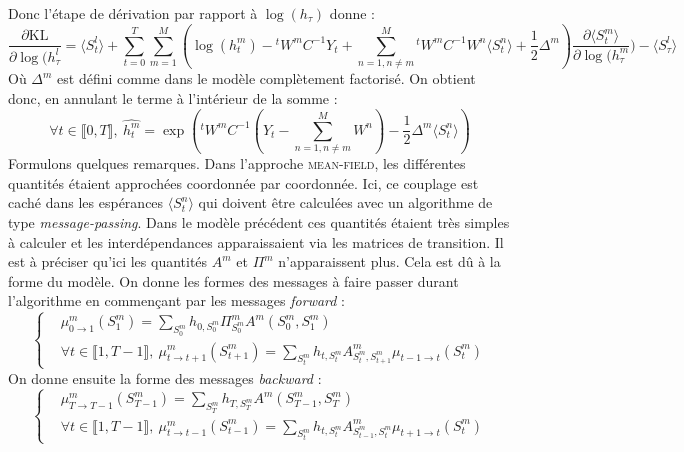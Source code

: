 \documentclass[10pt,a4paper]{article}
\newcommand{\meanfield}{\textsc{mean-field}}
\begin{document}
Donc l'étape de dérivation par rapport à $\log(h_{\tau})$ donne :
\begin{equation}
\frac{\partial \text{KL}}{\partial \log(h_{\tau}^l} = \langle S_t^l \rangle + 
\underset{t=0}{\overset{T}{\sum}} \underset{m=1}{\overset{M}{\sum}} \left( 
\log(h_t^m) -{}^t W^mC^{-1}Y_t + \underset{n=1, n \neq 
m}{\overset{M}{\sum}}{}^t W^m C^{-1} W^n \langle S_t^n \rangle + 
\frac{1}{2}\Delta^m \right) \frac{\partial \langle S_t^m \rangle}{\partial 
\log(h_{\tau}^m})-\langle S_{\tau}^l \rangle
\end{equation}
Où $\Delta^m$ est défini comme dans le modèle complètement factorisé. On 
obtient donc, en annulant le terme à l'intérieur de la somme :
\begin{equation}
\forall t \in \llbracket 0,T \rrbracket, \ \hat{h_t^m} = \exp \left( 
{}^tW^mC^{-1} \left( Y_t - \underset{n=1, n \neq m}{\overset{M}{\sum}} W^n 
\right) -\frac{1}{2} \Delta^m \langle S_t^n \rangle \right)
\end{equation}
Formulons quelques remarques. Dans l'approche \meanfield, les différentes 
quantités étaient approchées coordonnée par coordonnée. Ici, ce couplage est 
caché dans les espérances $\langle S_t^n \rangle$ qui doivent être calculées 
avec un algorithme de type \textit{message-passing}. Dans le modèle précédent 
ces quantités étaient très simples à calculer et les interdépendances 
apparaissaient via les matrices de transition. Il est à préciser qu'ici les 
quantités $A^m$ et $\Pi^m$ n'apparaissent plus. Cela est dû à la forme du 
modèle. On donne les formes des messages à faire passer durant l'algorithme en 
commençant par les messages \textit{forward} :
\begin{equation}
\left \lbrace
\begin{aligned}
& \mu_{0 \rightarrow 1}^m(S_1^m) = \underset{S_0^m}{\sum} h_{0,S_0^m} 
\Pi^m_{S_0^m} A^m(S_0^m, S_1^m) \\
&\forall t \in \llbracket 1,T-1 \rrbracket, \ \mu_{t \rightarrow 
t+1}^m(S_{t+1}^m)=\underset{S_t^m}{\sum} h_{t,S_t^m} A_{S_t^m,S_{t+1}^m}^m 
\mu_{t-1 \rightarrow t}(S_t^m)
\end{aligned}
\right.
\end{equation}
On donne ensuite la forme des messages \textit{backward} : 
\begin{equation}
\left \lbrace
\begin{aligned}
& \mu_{T \rightarrow T-1}^m(S_{T-1}^m) = \underset{S_T^m}{\sum} h_{T,S_T^m} 
A^m(S_{T-1}^m, S_T^m) \\
&\forall t \in \llbracket 1,T-1 \rrbracket, \ \mu_{t \rightarrow 
t-1}^m(S_{t-1}^m)=\underset{S_t^m}{\sum} h_{t,S_t^m} A_{S_{t-1}^m,S_{t}^m}^m 
\mu_{t+1 \rightarrow t}(S_t^m)
\end{aligned}
\right.
\end{equation}
\end{document}
